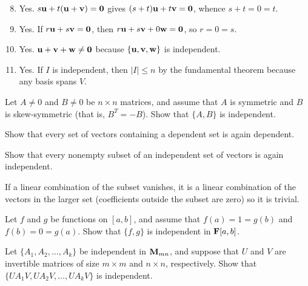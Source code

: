 \begin{multicols}{2}
\begin{ex}
\begin{sol}
\begin{enumerate}[label={\alph*.}]
\setcounter{enumi}{7}
\item  Yes. $s\textbf{u} + t(\textbf{u} + \textbf{v}) = \textbf{0}$ gives $(s + t)\textbf{u} + t\textbf{v} = \textbf{0}$, whence $s + t = 0 = t$.

\setcounter{enumi}{9}
\item  Yes. If $r\textbf{u} + s\textbf{v} = \textbf{0}$, then $r\textbf{u} + s\textbf{v} + 0\textbf{w} = \textbf{0}$, so $r = 0 = s$.

\setcounter{enumi}{11}
\item  Yes. $\textbf{u} + \textbf{v} + \textbf{w} \neq \textbf{0}$ because $\{\textbf{u}, \textbf{v}, \textbf{w}\}$ is independent.

\setcounter{enumi}{13}
\item  Yes. If $I$ is independent, then $|I| \leq n$ by the fundamental theorem because any basis spans $V$.

\end{enumerate}
\end{sol}
\end{ex}

\begin{ex}
Let $A \neq 0$ and $B \neq 0$ be $n \times n$ matrices, and assume that $A$ is symmetric and $B$ is skew-symmetric (that is, $B^{T} = -B$). Show that $\{A, B\}$ is independent.
\end{ex}

\begin{ex}
Show that every set of vectors containing a dependent set is again dependent.
\end{ex}

\begin{ex} \label{ex:6_3_15}
Show that every nonempty subset of an independent set of vectors is again independent.

\begin{sol}
If a linear combination of the subset vanishes, it is a linear combination of the vectors in the larger set (coefficients outside the subset are zero) so it is trivial.
\end{sol}
\end{ex}

\begin{ex}
Let $f$ and $g$ be functions on $[a, b]$, and assume that $f(a) = 1 = g(b)$ and $f(b) = 0 = g(a)$. Show that $\{f, g\}$ is independent in $\textbf{F}[a, b]$.
\end{ex}

\begin{ex}
Let $\{A_{1}, A_{2}, \dots, A_{k}\}$ be independent in $\textbf{M}_{mn}$, and suppose that $U$ and $V$ are invertible matrices of size $m \times m$ and $n \times n$, respectively. Show that $\{UA_{1}V, UA_{2}V, \dots, UA_{k}V\}$ is independent.
\end{ex}


\end{multicols}

